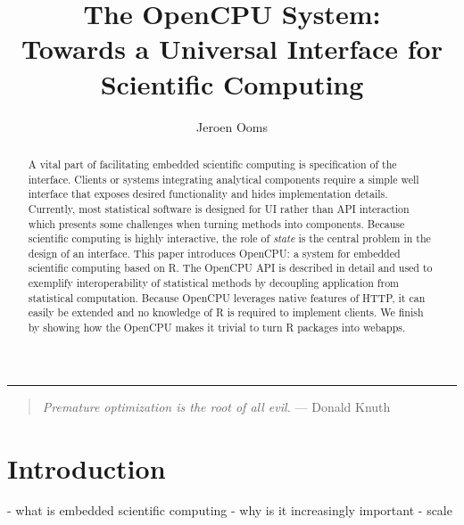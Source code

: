 \documentclass{article}
\author{Jeroen Ooms}
\title{The OpenCPU System:\\ Towards a Universal Interface for Scientific Computing}
\newcommand{\GUI}{\texttt{GUI}\xspace}
\newcommand{\CLI}{\texttt{CLI}\xspace}
\newcommand{\UI}{\texttt{UI}\xspace}
\newcommand{\API}{\texttt{API}\xspace}
\begin{document}
\maketitle

\begin{abstract}
A vital part of facilitating embedded scientific computing is specification of the interface. Clients or systems integrating analytical components require a simple well interface that exposes desired functionality and hides implementation details. Currently, most statistical software is designed for UI rather than API interaction which presents some challenges when turning methods into components. Because scientific computing is highly interactive, the role of \emph{state} is the central problem in the design of an interface. This paper introduces OpenCPU: a system for embedded scientific computing based on R. The OpenCPU API is described in detail and used to exemplify interoperability of statistical methods by decoupling application from statistical computation. Because OpenCPU leverages native features of HTTP, it can easily be extended and no knowledge of R is required to implement clients. We finish by showing how the OpenCPU makes it trivial to turn R packages into webapps.
\end{abstract}

\begin{center}
\noindent\rule{8cm}{0.4pt}
\end{center}

\vspace{8pt}

\begin{quote}
\emph{Premature optimization is the root of all evil.} --- Donald Knuth
\end{quote}

\section{Introduction}

- what is embedded scientific computing
- why is it increasingly important
- scale


\end{document}
